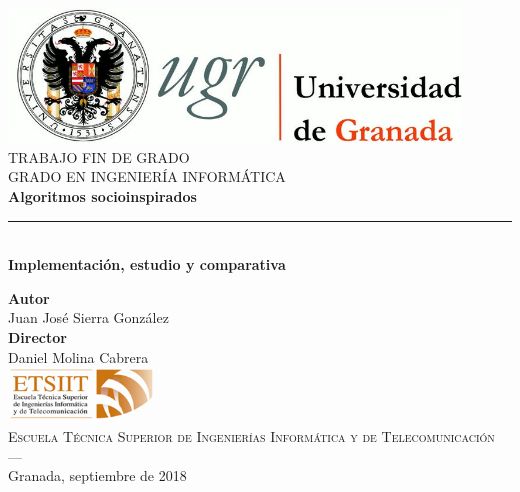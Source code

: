 \begin{titlepage}
 
 
\newlength{\centeroffset}
\setlength{\centeroffset}{-0.5\oddsidemargin}
\addtolength{\centeroffset}{0.5\evensidemargin}
\thispagestyle{empty}

\noindent\hspace*{\centeroffset}\begin{minipage}{\textwidth}

\centering
\includegraphics[width=0.9\textwidth]{imagenes/logo_ugr.jpg}\\[1.4cm]

\textsc{ \Large TRABAJO FIN DE GRADO\\[0.2cm]}
\textsc{GRADO EN INGENIERÍA INFORMÁTICA}\\[1cm]
% 
{\Huge\bfseries Algoritmos socioinspirados\\
}
\noindent\rule[-1ex]{\textwidth}{3pt}\\[3.5ex]
{\large\bfseries Implementación, estudio y comparativa}
\end{minipage}

\vspace{2.5cm}
\noindent\hspace*{\centeroffset}\begin{minipage}{\textwidth}
\centering

\textbf{Autor}\\ {Juan José Sierra González}\\[2.5ex]
\textbf{Director}\\
{Daniel Molina Cabrera}\\[2cm]
\includegraphics[width=0.3\textwidth]{imagenes/etsiit_logo.png}\\[0.1cm]
\textsc{Escuela Técnica Superior de Ingenierías Informática y de Telecomunicación}\\
\textsc{---}\\
Granada, septiembre de 2018
\end{minipage}
\end{titlepage}


